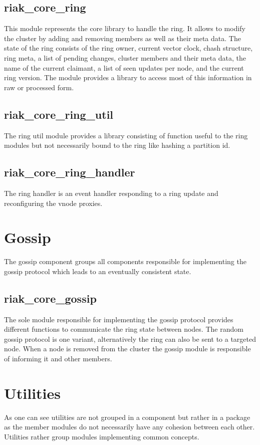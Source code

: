 	\subsection{riak\_core\_ring}
		This module represents the core library to handle the ring.
		It allows to modify the cluster by adding and removing members as well as their meta data.
		The state of the ring consists of the ring owner, current vector clock, chash structure, ring meta, a list of pending changes, cluster members and their meta data, the name of the current claimant, a list of seen updates per node, and the current ring version.
		The module provides a library to access most of this information in raw or processed form.
	
	\subsection{riak\_core\_ring\_util}
		The ring util module provides a library consisting of function useful to the ring modules but not necessarily bound to the ring like hashing a partition id.
	
	\subsection{riak\_core\_ring\_handler}
		The ring handler is an event handler responding to a ring update and reconfiguring the vnode proxies.
	

\section{Gossip}
	The gossip component groups all components responsible for implementing the gossip protocol which leads to an eventually consistent state.
	\subsection{riak\_core\_gossip}
		The sole module responsible for implementing the gossip protocol provides different functions to communicate the ring state between nodes.
		The random gossip protocol is one variant, alternatively the ring can also be sent to a targeted node.
		When a node is removed from the cluster the gossip module is responsible of informing it and other members.
	

\section{Utilities}
	As one can see utilities are not grouped in a component but rather in a package as the member modules do not necessarily have any cohesion between each other.
	Utilities rather group modules implementing common concepts.

